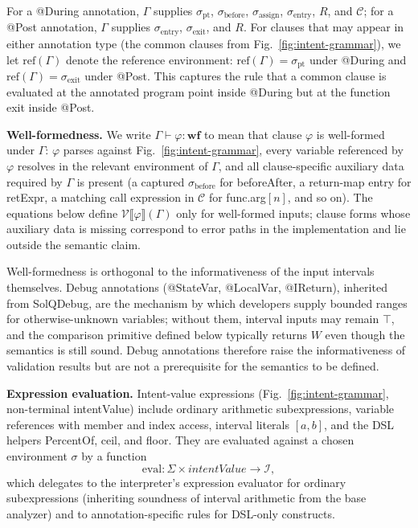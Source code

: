 \documentclass[pdflatex,sn-basic]{sn-jnl}%
\theoremstyle{thmstyleone}%
\theoremstyle{thmstyletwo}%
\theoremstyle{thmstylethree}%
\begin{document}
For a @During annotation, $\Gamma$ supplies $\sigma_{\text{pt}}$, $\sigma_{\text{before}}$, $\sigma_{\text{assign}}$, $\sigma_{\text{entry}}$, $R$, and $\mathcal{C}$; for a @Post annotation, $\Gamma$ supplies $\sigma_{\text{entry}}$, $\sigma_{\text{exit}}$, and $R$.
For clauses that may appear in either annotation type (the common clauses from Fig.~\ref{fig:intent-grammar}), we let $\text{ref}(\Gamma)$ denote the reference environment: $\text{ref}(\Gamma) = \sigma_{\text{pt}}$ under @During and $\text{ref}(\Gamma) = \sigma_{\text{exit}}$ under @Post.
This captures the rule that a common clause is evaluated at the annotated program point inside @During but at the function exit inside @Post.

\smallskip
\noindent\textbf{Well-formedness.}
We write $\Gamma \vdash \varphi : \mathbf{wf}$ to mean that clause $\varphi$ is well-formed under $\Gamma$: $\varphi$ parses against Fig.~\ref{fig:intent-grammar}, every variable referenced by $\varphi$ resolves in the relevant environment of $\Gamma$, and all clause-specific auxiliary data required by $\Gamma$ is present (a captured $\sigma_{\text{before}}$ for beforeAfter, a return-map entry for retExpr, a matching call expression in $\mathcal{C}$ for func.arg$[n]$, and so on).
The equations below define $\mathcal{V}\llbracket \varphi \rrbracket(\Gamma)$ only for well-formed inputs; clause forms whose auxiliary data is missing correspond to error paths in the implementation and lie outside the semantic claim.

Well-formedness is orthogonal to the informativeness of the input intervals themselves.
Debug annotations (@StateVar, @LocalVar, @IReturn), inherited from SolQDebug, are the mechanism by which developers supply bounded ranges for otherwise-unknown variables; without them, interval inputs may remain $\top$, and the comparison primitive defined below typically returns $W$ even though the semantics is still sound.
Debug annotations therefore raise the informativeness of validation results but are not a prerequisite for the semantics to be defined.

\smallskip
\noindent\textbf{Expression evaluation.}
Intent-value expressions (Fig.~\ref{fig:intent-grammar}, non-terminal intentValue) include ordinary arithmetic subexpressions, variable references with member and index access, interval literals $[a, b]$, and the DSL helpers PercentOf, ceil, and floor.
They are evaluated against a chosen environment $\sigma$ by a function
\[
\text{eval} : \Sigma \times intentValue \to \mathcal{I},
\]
which delegates to the interpreter's expression evaluator for ordinary subexpressions (inheriting soundness of interval arithmetic from the base analyzer) and to annotation-specific rules for DSL-only constructs.
\end{document}

